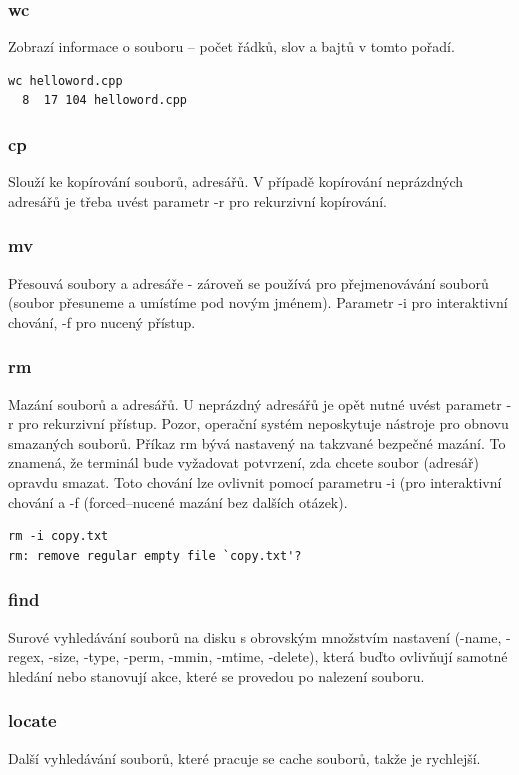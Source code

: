 \documentclass{article}
\begin{document}
\subsubsection{wc}
Zobrazí informace o souboru -- počet řádků, slov a bajtů v tomto pořadí.
\begin{verbatim}
wc helloword.cpp
  8  17 104 helloword.cpp
\end{verbatim}

\subsubsection{cp}
Slouží ke kopírování souborů, adresářů. V případě kopírování neprázdných adresářů je třeba uvést parametr -r pro rekurzivní kopírování.

\subsubsection{mv}
Přesouvá soubory a adresáře - zároveň se používá pro přejmenovávání souborů (soubor přesuneme a umístíme pod novým jménem). Parametr -i pro interaktivní chování, -f pro nucený přístup.

\subsubsection{rm}
Mazání souborů a adresářů. U neprázdný adresářů je opět nutné uvést parametr -r pro rekurzivní přístup. Pozor, operační systém neposkytuje nástroje pro obnovu smazaných souborů. Příkaz rm bývá nastavený na takzvané bezpečné mazání. To znamená, že terminál bude vyžadovat potvrzení, zda chcete soubor (adresář) opravdu smazat. Toto chování lze ovlivnit pomocí parametru -i (pro interaktivní chování a -f (forced--nucené mazání bez dalších otázek).

\begin{verbatim}
rm -i copy.txt
rm: remove regular empty file `copy.txt'? 
\end{verbatim}

\subsubsection{find}
Surové vyhledávání souborů na disku s obrovským množstvím nastavení (-name, -regex, -size, -type, -perm, -mmin, -mtime, -delete), která buďto ovlivňují samotné hledání nebo stanovují akce, které se provedou po nalezení souboru.

\subsubsection{locate}
Další vyhledávání souborů, které pracuje se cache souborů, takže je rychlejší.
\end{document}
